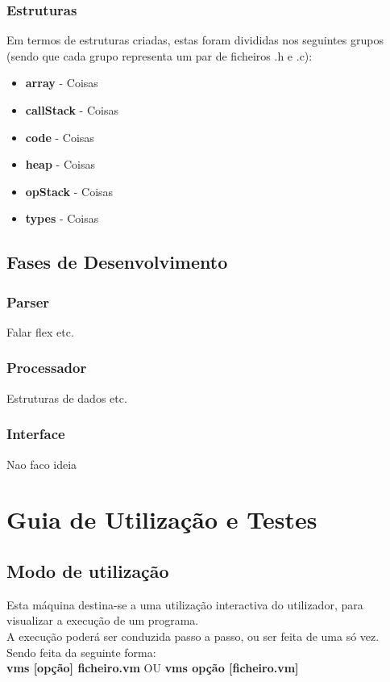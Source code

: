 \documentclass{report}
\begin{document}
\subsection{Estruturas}

Em termos de estruturas criadas, estas foram divididas nos seguintes grupos
(sendo que cada grupo representa um par de ficheiros .h e .c):


\begin{itemize}
	\item \textbf{array} - Coisas
	\item \textbf{callStack} - Coisas
	\item \textbf{code} - Coisas
	\item \textbf{heap} - Coisas
	\item \textbf{opStack} - Coisas
	\item \textbf{types} - Coisas
\end{itemize}
\section{Fases de Desenvolvimento}
\subsection{Parser}
\quad Falar flex etc.
\subsection{Processador}
\quad Estruturas de dados etc.
\subsection{Interface}
\quad Nao faco ideia

\chapter{Guia de Utilização e Testes}
\section{Modo de utilização}
\quad Esta máquina destina-se a uma utilização interactiva do utilizador, para visualizar a execução de um programa.\\
A execução poderá ser conduzida passo a passo, ou ser feita de uma só vez.\\
Sendo feita da seguinte forma:\\

\quad \textbf{vms [opção] ficheiro.vm} OU \textbf{vms opção [ficheiro.vm]}\\
\end{document}
